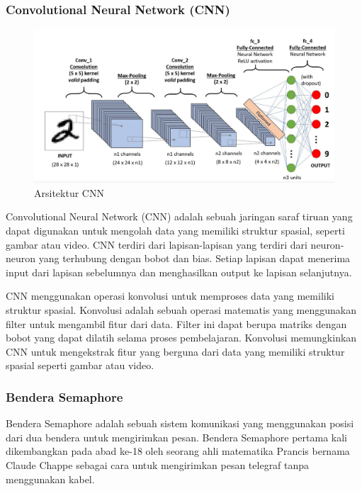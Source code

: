 \subsubsection{Convolutional Neural Network (CNN)}
\begin{figure} [ht] \centering
  \includegraphics[scale=0.5]{gambar/arsitekturCNN.png}
  \caption{Arsitektur CNN}
  \label{fig:Ujicoba Sementara}
\end{figure}
Convolutional Neural Network (CNN) adalah sebuah jaringan saraf tiruan yang dapat digunakan untuk mengolah data yang memiliki struktur spasial, seperti gambar atau video. CNN terdiri dari lapisan-lapisan yang terdiri dari neuron-neuron yang terhubung dengan bobot dan bias. Setiap lapisan dapat menerima input dari lapisan sebelumnya dan menghasilkan output ke lapisan selanjutnya.
\parencite{DeepLearningDef}

CNN menggunakan operasi konvolusi untuk memproses data yang memiliki struktur spasial. Konvolusi adalah sebuah operasi matematis yang menggunakan filter untuk mengambil fitur dari data. Filter ini dapat berupa matriks dengan bobot yang dapat dilatih selama proses pembelajaran. Konvolusi memungkinkan CNN untuk mengekstrak fitur yang berguna dari data yang memiliki struktur spasial seperti gambar atau video.

\subsubsection{Bendera Semaphore}
Bendera Semaphore adalah sebuah sistem komunikasi yang menggunakan posisi dari dua bendera untuk mengirimkan pesan. Bendera Semaphore pertama kali dikembangkan pada abad ke-18 oleh seorang ahli matematika Prancis bernama Claude Chappe sebagai cara untuk mengirimkan pesan telegraf tanpa menggunakan kabel. \parencite{SemaphoreHistory}

